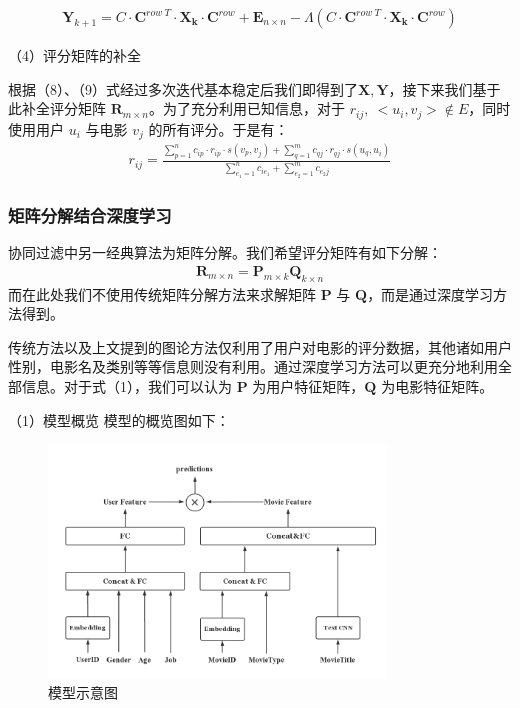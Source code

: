 \begin{spacing}{1.5}
{\setlength\belowdisplayskip{1pt}
\begin{align}
\mathbf{Y}_{k+1} = C\cdot\mathbf{C}^{row\ T}\cdot \mathbf{X_k} \cdot \mathbf{C}^{row}+ \mathbf{E}_{n\times n} - \Lambda (C\cdot\mathbf{C}^{row\ T}\cdot \mathbf{X_k} \cdot \mathbf{C}^{row})
\end{align}
}\par
（4）评分矩阵的补全\par
根据（8）、（9）式经过多次迭代基本稳定后我们即得到了$\mathbf{X},\mathbf{Y}$，接下来我们基于此补全评分矩阵 $\mathbf{R}_{m\times n}$。为了充分利用已知信息，对于 $r_{ij},\ <u_i,v_j>\notin E$，同时使用用户 $u_i$ 与电影 $v_j$ 的所有评分。于是有：
{\setlength\abovedisplayskip{1pt}
\setlength\belowdisplayskip{1pt}
\begin{align}
r_{ij} = 
\frac{\sum_{p=1}^n c_{ip}\cdot r_{ip}\cdot s(v_p,v_j) + \sum_{q=1}^{m} c_{qj}\cdot r_{qj}\cdot s(u_q,u_i)}{\sum_{e_1 = 1}^n c_{ie_1}+ \sum_{e_2 = 1}^m c_{e_2j}}
\end{align}
}\par
\subsubsection{矩阵分解结合深度学习}
协同过滤中另一经典算法为矩阵分解。我们希望评分矩阵有如下分解： 
{\setlength\abovedisplayskip{1pt}
\setlength\belowdisplayskip{1pt}
\begin{align}
\mathbf{R}_{m\times n}=\mathbf{P}_{m\times k}\mathbf{Q}_{k\times n}
\end{align}
}
而在此处我们不使用传统矩阵分解方法来求解矩阵 $\mathbf{P}$ 与 $\mathbf{Q}$，而是通过深度学习方法得到。\par
传统方法以及上文提到的图论方法仅利用了用户对电影的评分数据，其他诸如用户性别，电影名及类别等等信息则没有利用。通过深度学习方法可以更充分地利用全部信息。对于式（1），我们可以认为 $\mathbf{P}$ 为用户特征矩阵，$\mathbf{Q}$ 为电影特征矩阵。\par
（1）模型概览
模型的概览图如下：
\clearpage
\begin{figure}
\setlength{\abovecaptionskip}{0.cm}
\setlength{\belowcaptionskip}{-0.cm}
\centering
\includegraphics[width=0.8\textwidth]{Figure/2.png}
\caption{模型示意图}
\end{figure}


\end{spacing}
